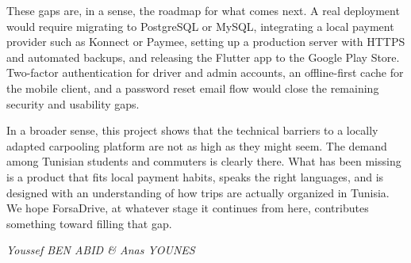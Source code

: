 \par These gaps are, in a sense, the roadmap for what comes next. A real deployment would require migrating to PostgreSQL or MySQL, integrating a local payment provider such as Konnect or Paymee, setting up a production server with HTTPS and automated backups, and releasing the Flutter app to the Google Play Store. Two-factor authentication for driver and admin accounts, an offline-first cache for the mobile client, and a password reset email flow would close the remaining security and usability gaps.

\par In a broader sense, this project shows that the technical barriers to a locally adapted carpooling platform are not as high as they might seem. The demand among Tunisian students and commuters is clearly there. What has been missing is a product that fits local payment habits, speaks the right languages, and is designed with an understanding of how trips are actually organized in Tunisia. We hope ForsaDrive, at whatever stage it continues from here, contributes something toward filling that gap.

\vspace{0.8cm}
\begin{flushright}
\textit{Youssef BEN ABID \quad \& \quad Anas YOUNES}
\end{flushright}
